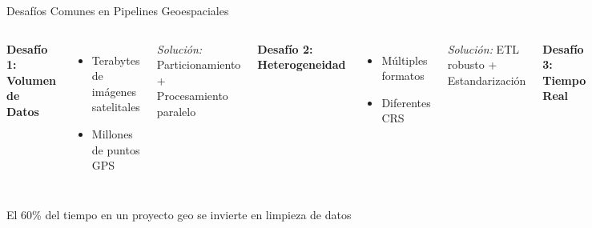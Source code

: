 \documentclass[10pt,aspectratio=169]{beamer}
\newcommand{\alertbox}[1]{
\begin{tcolorbox}[colframe=red!70,colback=red!5]
\centering\faExclamationTriangle\space #1
\end{tcolorbox}
}
\begin{document}
\begin{frame}{Desafíos Comunes en Pipelines Geoespaciales}
    \begin{columns}[T]
        \textbf{\faExclamationTriangle\space Desafío 1: Volumen de Datos}
        \begin{itemize}
            \item Terabytes de imágenes satelitales
            \item Millones de puntos GPS
        \end{itemize}
        \textit{Solución:} Particionamiento + Procesamiento paralelo
        
        \vspace{0.3cm}
        \textbf{\faExclamationTriangle\space Desafío 2: Heterogeneidad}
        \begin{itemize}
            \item Múltiples formatos
            \item Diferentes CRS
        \end{itemize}
        \textit{Solución:} ETL robusto + Estandarización
        
        \textbf{\faExclamationTriangle\space Desafío 3: Tiempo Real}
        \begin{itemize}
            \item Actualizaciones constantes
            \item Baja latencia requerida
        \end{itemize}
        \textit{Solución:} Stream processing + Caché
        
        \vspace{0.3cm}
        \textbf{\faExclamationTriangle\space Desafío 4: Calidad de Datos}
        \begin{itemize}
            \item Geometrías inválidas
            \item Datos faltantes
        \end{itemize}
        \textit{Solución:} Validación + Limpieza automática
    \end{columns}
    
    \vspace{0.3cm}
    \alertbox{El 60\% del tiempo en un proyecto geo se invierte en limpieza de datos}
\end{frame}
\end{document}
